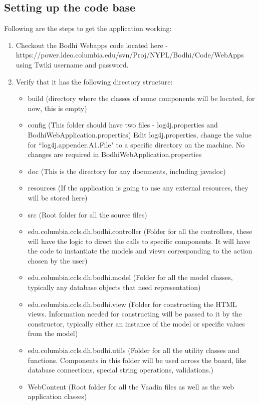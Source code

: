 \documentclass[12pt]{article}
\begin{document}
\subsection{Setting up the code base}
Following are the steps to get the application working:
\begin{enumerate}
\item Checkout the Bodhi Webapps code located here -\\ https://power.ldeo.columbia.edu/svn/Proj/NYPL/Bodhi/Code/WebApps using Twiki username and password.

\item Verify that it has the following directory structure:
\begin{itemize}
    \item build (directory where the classes of some components will be located, for now, this is empty)
\item config (This folder should have two files - log4j.properties and BodhiWebApplication.properties)
Edit log4j.properties, change the value for ``log4j.appender.A1.File" to a specific directory on the machine.
No changes are required in BodhiWebApplication.properties
\item doc (This is the directory for any documents, including javadoc)
\item resources (If the application is going to use any external resources, they will be stored here)
\item src (Root folder for all the source files)
\item edu.columbia.ccls.dh.bodhi.controller (Folder for all the controllers, these will have the logic to direct the calls to specific components. It will have the code to instantiate the models and views corresponding to the action chosen by the user)
\item edu.columbia.ccls.dh.bodhi.model (Folder for all the model classes, typically any database objects that need representation)
\item edu.columbia.ccls.dh.bodhi.view (Folder for constructing the HTML views. Information needed for constructing will be passed to it by the constructor, typically either an instance of the model or specific values from the model)
\item edu.columbia.ccls.dh.bodhi.utils (Folder for all the utility classes and functions. Components in this folder will be used across the board, like database connections, special string operations, validations.)
\item WebContent (Root folder for all the Vaadin files as well as the web application classes)
\end{itemize}


\end{enumerate}
\end{document}
